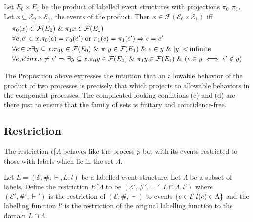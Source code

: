 \documentclass{article}
\begin{document}
\begin{proposition}

    Let $E_0 \times E_1$ be the product of labelled event structures with projections
    $\pi_0,\pi_1$.
    Let $x \subseteq \mathcal{E}_0 \times \mathcal{E}_1$, the events of the product.
    Then $x \in \mathcal{F}(\mathcal{E}_0 \times \mathcal{E}_1)$ iff
    \begin{align*}
         & \pi_0(x)  \in \mathcal{F}(E_0) \ \& \  \pi_1x \in \mathcal{F}(E_1)                                      \\
         & \forall e,e' \in x.\pi_0(e)=\pi_0(e') \text{ or } \pi_1(e) = \pi_1(e') \Rightarrow e = e'            \\
         & \forall e \in x \exists y \subseteq x. \pi_0 y \in \mathcal{F}(E_0) \ \& \  \pi_1y \in \mathcal{F}(E_1)
        \ \& \  e \in y \ \& \  |y| < \text{infinite}                                                                 \\
         & \forall e,e' in x. e \neq e' \Rightarrow \exists y \subseteq x.\pi_0 y \in \mathcal{F}(E_0)
        \ \& \  \pi_1y \in \mathcal{F}(E_1) \ \& \  (e \in y \iff e' \not \in y)
    \end{align*}
\end{proposition}
The Proposition above expresses the intuition that an allowable behavior of the product
of two processes is precisely that which projects to allowable behaviors in the component
processes.
The complicated-looking conditions (c) and (d) are there just to ensure that the family
of sets is finitary and coincidence-free.

\subsection{Restriction}

The restriction $t \lceil \Lambda$ behaves like the process $p$ but with its events
restricted to those with labels which lie in the set $\Lambda$.

\begin{definition}

    Let $E = (\mathcal{E},\#,\vdash,L,l)$ be a labelled event structure.
    Let $\Lambda$ be a subset of labels.
    Define the restriction $E\lceil \Lambda$ to be $(\mathcal{E'},\#',\vdash',L\cap \Lambda,l')$
    where $(\mathcal{E'},\#',\vdash')$ is the restriction of $(\mathcal{E},\#,\vdash)$
    to events $\{e \in \mathcal{E}|l(e) \in \Lambda\}$ and the labelling function $l'$
    is the restriction of the original labelling function to the domain $L \cap \Lambda$.

\end{definition}
\end{document}
